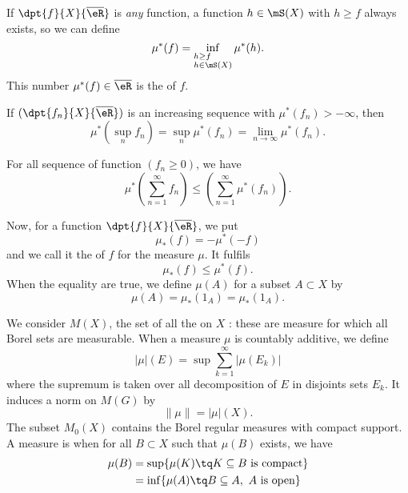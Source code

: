 If $\dpt{f}{X}{\overline{ \eR }}$ is \emph{any} function, a function $h\in\mS(X)$ with $h\geq f$ always exists, so we can define
\begin{equation}
  \mu^*(f)=\inf_{%
\begin{subarray}{l}
h\geq f\\
h\in\mS(X)
\end{subarray}
} \mu^*(h).
\end{equation}
This number $\mu^*(f)\in\overline{ \eR }$ is the  of $f$.


\begin{proposition}
If $(\dpt{f_n}{X}{\overline{ \eR }})$ is an increasing sequence with $\mu^*(f_n)>-\infty$, then
\[ 
  \mu^*(\sup_nf_n)=\sup_n\mu^*(f_n)=\lim_{n\to\infty}\mu^*(f_n).
\]

\end{proposition}

\begin{proposition}
For all sequence of function $(f_n\geq 0)$, we have
\[ 
  \mu^*\left( \sum_{n=1}^{\infty}f_n\right)\leq\left(\sum_{n=1}^{\infty}\mu^*(f_n) \right).
\]

\end{proposition}

Now, for a function $\dpt{f}{X}{\overline{ \eR }}$, we put
\begin{equation}
  \mu_*(f)=-\mu^*(-f)
\end{equation}
and we call it the  of $f$ for the measure $\mu$. It fulfils
\[ 
  \mu_*(f)\leq\mu^*(f).
\]
When the equality are true, we define $\mu(A)$ for a subset $A\subset X$ by
\begin{equation}
   \mu(A)=\mu_*(1_A)=\mu_*(1_A).
\end{equation}

We consider $M(X)$\label{defMX}, the set of all the  on $X$ : these are measure for which all Borel sets are measurable. When a measure $\mu$ is countably additive, we define
\begin{equation}
   | \mu |(E)=\sup \sum_{k=1}^{\infty}| \mu(E_k) |
\end{equation}
where the supremum is taken over all decomposition of $E$ in disjoints sets $E_k$. It induces a norm on $M(G)$ by
\[ 
  \| \mu \|=| \mu |(X).
\]
The subset  $M_0(X)$\label{defMzX} contains the Borel regular measures with compact support. A measure is  when for all $B\subset X$ such that $\mu(B)$ exists, we have
\begin{equation}
\begin{split}
    \mu(B)&=\sup\{ \mu(K)\tq K\subseteq B \textrm{ is compact} \}\\
		&=\inf\{ \mu(A)\tq B\subseteq A, \textrm{ $A$ is open} \}
\end{split}
\end{equation}


